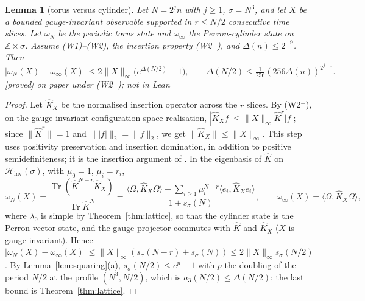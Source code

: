 \documentclass[11pt,a4paper]{article}
\theoremstyle{plain}
\newtheorem{lemma}[theorem]{Lemma}
\theoremstyle{definition}
\theoremstyle{remark}
\numberwithin{equation}{section}
\newcommand{\Z}{\mathbb{Z}}
\newcommand{\Tr}{\operatorname{Tr}}
\newcommand{\Hinv}{\mathcal{H}_{\mathrm{inv}}}
\newcommand{\Kh}{\widehat K}
\newcommand{\st}[1]{\textsf{[#1]}}
\begin{document}
\begin{lemma}[torus versus cylinder]\label{lem:torus}
Let $N=2^jn$ with $j\ge1$, $\sigma=N^3$, and let $X$ be a bounded gauge-invariant observable supported in $r\le N/2$ consecutive time
slices. Let $\omega_N$ be the periodic torus state and $\omega_\infty$ the Perron-cylinder state on $\Z\times\sigma$. Assume (W1)--(W2),
the insertion property (W2$^+$), and $\Delta(n)\le2^{-9}$. Then
\[
|\omega_N(X)-\omega_\infty(X)|\le2\|X\|_\infty\bigl(e^{\Delta(N/2)}-1\bigr),\qquad \Delta(N/2)\le\tfrac1{256}(256\Delta(n))^{2^{j-1}}.
\]
\st{proved} on paper under (W2$^+$); not in Lean
\end{lemma}
\begin{proof}
Let $\Kh_X$ be the normalised insertion operator across the $r$ slices. By (W2$^+$), on the gauge-invariant configuration-space realisation,
$|\Kh_Xf|\le\|X\|_\infty\Kh^r|f|$; since $\|\Kh^r\|=1$ and $\||f|\|_2=\|f\|_2$, we get $\|\Kh_X\|\le\|X\|_\infty$. This step uses positivity
preservation and insertion domination, in addition to positive semidefiniteness; it is the insertion argument of \cite[proof of Prop.~2.2]{OAI26}.
In the eigenbasis of $\Kh$ on $\Hinv(\sigma)$, with $\mu_0=1$, $\mu_i=r_i$,
\[
\omega_N(X)=\frac{\Tr(\Kh^{N-r}\Kh_X)}{\Tr\Kh^N}=\frac{\langle\Omega,\Kh_X\Omega\rangle+\sum_{i\ge1}\mu_i^{N-r}\langle e_i,\Kh_Xe_i\rangle}{1+s_\sigma(N)},
\qquad\omega_\infty(X)=\langle\Omega,\Kh_X\Omega\rangle,
\]
where $\lambda_0$ is simple by Theorem~\ref{thm:lattice}, so that the cylinder state is the Perron vector state, and the gauge
projector commutes with $\Kh$ and $\Kh_X$ ($X$ is gauge invariant). Hence
$|\omega_N(X)-\omega_\infty(X)|\le\|X\|_\infty(s_\sigma(N-r)+s_\sigma(N))\le2\|X\|_\infty s_\sigma(N/2)$. By Lemma~\ref{lem:squaring}(a),
$s_\sigma(N/2)\le e^{p}-1$ with $p$ the doubling of the period $N/2$ at the profile $(N^3,N/2)$, which is $a_3(N/2)\le\Delta(N/2)$; the
last bound is Theorem~\ref{thm:lattice}.
\end{proof}
\end{document}
